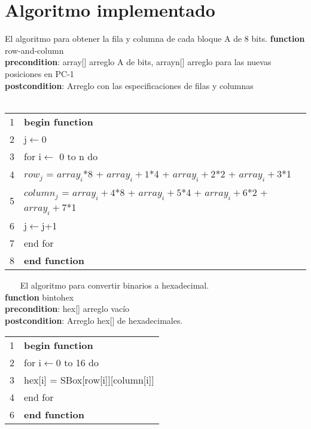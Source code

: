\documentclass{report}
\newcommand \minitab{\hspace*{15 pt}}
\begin{document}
\section{Algoritmo implementado}
El algoritmo para obtener la fila y columna de cada bloque A de 8 bits.
\newline
\newline
{\bf function} row-and-column\\
{\bf precondition}: array[] arreglo A de bits, arrayn[] arreglo para las nuevas posiciones en PC-1\\
{\bf postcondition}: Arreglo con las especificaciones de filas y columnas\\
\newline
\newline
~~
\begin{tabular}{r l}
\\
1 & \bf{begin function} \\
2 & \minitab j$\leftarrow$0\\
3 & \minitab for i$\leftarrow$ 0 to n do\\
4 & \minitab \minitab $row_j$ = $array_i$*8 + $array_i+1$*4 + $array_i+2$*2 + $array_i+3$*1\\
5 & \minitab \minitab $column_j$ = $array_i+4$*8 + $array_i+5$*4 + $array_i+6$*2 + $array_i+7$*1\\
6 & \minitab \minitab j$\leftarrow$j+1\\
7 & \minitab end for\\
8 & \bf end function\\
\end{tabular}
~~~
\newline
\newline
\newline
\newline
El algoritmo para convertir binarios a hexadecimal.\\
\newline
{\bf function} bintohex\\
{\bf precondition}: hex[] arreglo vac\'io\\
{\bf postcondition}: Arreglo hex[] de hexadecimales.\\
\newline
\newline
\begin{tabular}{r l}
\\
1 & \bf{begin function} \\
2 & \minitab for i$\leftarrow$0 to 16 do\\
3 & \minitab \minitab hex[i] = SBox[row[i]][column[i]]\\
4 & \minitab end for\\
6 & \bf end function\\
\end{tabular}
\end{document}
